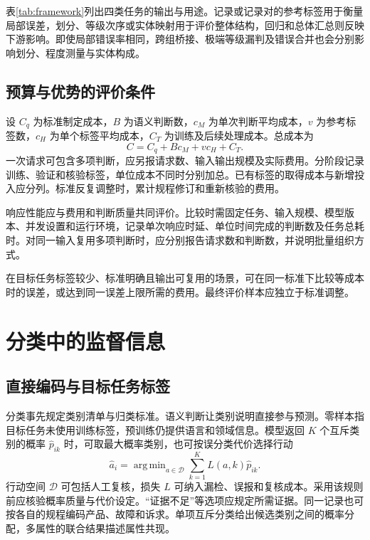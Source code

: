 \documentclass[UTF8,a4paper,zihao=-4,fontset=fandol]{ctexart}
\DeclareMathOperator*{\argmin}{arg\,min}
\begin{document}
表\ref{tab:framework}列出四类任务的输出与用途。记录或记录对的参考标签用于衡量局部误差，划分、等级次序或实体映射用于评价整体结构，回归和总体汇总则反映下游影响。即使局部错误率相同，跨组桥接、极端等级漏判及错误合并也会分别影响划分、程度测量与实体构成。

\subsection{预算与优势的评价条件}

设 $C_q$ 为标准制定成本，$B$ 为语义判断数，$c_M$ 为单次判断平均成本，$v$ 为参考标签数，$c_H$ 为单个标签平均成本，$C_T$ 为训练及后续处理成本。总成本为
\begin{equation}
 C=C_q+B c_M+v c_H+C_T.
 \label{eq:cost}
\end{equation}
一次请求可包含多项判断，应另报请求数、输入输出规模及实际费用。分阶段记录训练、验证和核验标签，单位成本不同时分别加总。已有标签的取得成本与新增投入应分列。标准反复调整时，累计规程修订和重新核验的费用。

响应性能应与费用和判断质量共同评价。比较时需固定任务、输入规模、模型版本、并发设置和运行环境，记录单次响应时延、单位时间完成的判断数及任务总耗时。对同一输入复用多项判断时，应分别报告请求数和判断数，并说明批量组织方式。

在目标任务标签较少、标准明确且输出可复用的场景，可在同一标准下比较等成本时的误差，或达到同一误差上限所需的费用。最终评价样本应独立于标准调整。

\section{分类中的监督信息}\label{sec:classification}

\subsection{直接编码与目标任务标签}

分类事先规定类别清单与归类标准。语义判断让类别说明直接参与预测。零样本指目标任务未使用训练标签，预训练仍提供语言和领域信息\citep{yin2019}。模型返回 $K$ 个互斥类别的概率 $\widehat p_{ik}$ 时，可取最大概率类别，也可按误分类代价选择行动
\begin{equation}
 \widehat a_i=\argmin_{a\in\mathcal D}\sum_{k=1}^K L(a,k)\widehat p_{ik}.
 \label{eq:classification}
\end{equation}
行动空间 $\mathcal D$ 可包括人工复核，损失 $L$ 可纳入漏检、误报和复核成本。采用该规则前应核验概率质量与代价设定。“证据不足”等选项应规定所需证据。同一记录也可按各自的规程编码产品、故障和诉求。单项互斥分类给出候选类别之间的概率分配，多属性的联合结果描述属性共现。
\end{document}
